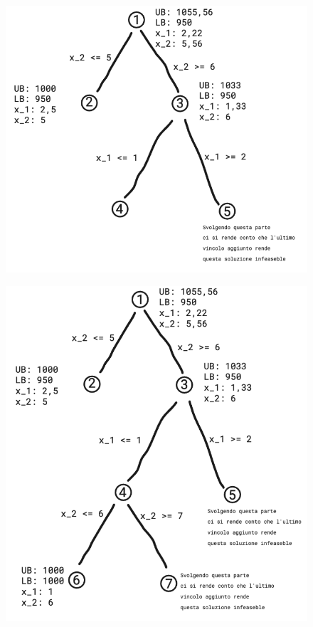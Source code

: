 \documentclass[12pt,a4paper]{article}
\begin{document}
\begin{figure}[h]
	\centering
	\includegraphics[width=0.8\linewidth]{img/b_b_2}
	\caption{}
	\label{fig:b_b_2}
\end{figure}
\begin{figure}[h]
	\centering
	\includegraphics[width=0.8\linewidth]{img/b_b_3}
	\caption{}
	\label{fig:b_b_3}
\end{figure}
\end{document}
